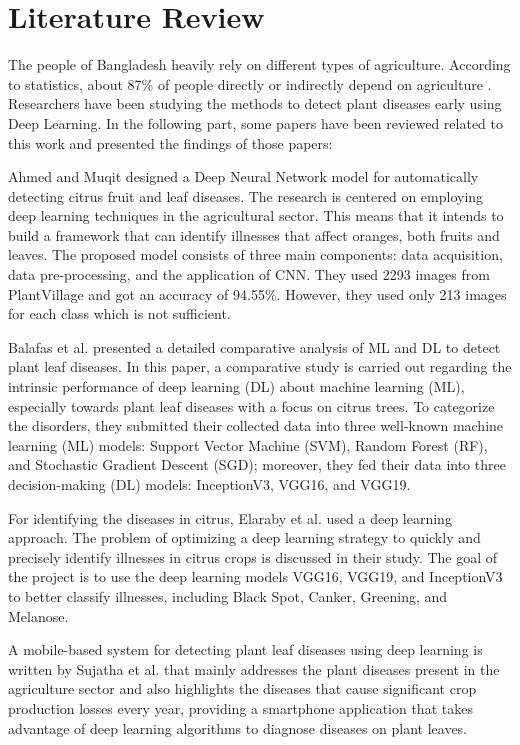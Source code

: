 \documentclass{ijcaArticle}
\begin{document}
\section{Literature Review}

\label{sec:literature_review}

The people of Bangladesh heavily rely on different types of agriculture. According to statistics, about 87\% of people directly or indirectly depend on agriculture \cite{p9}. Researchers have been studying the methods to detect plant diseases early using Deep Learning. In the following part, some papers have been reviewed related to this work and presented the findings of those papers:

Ahmed and Muqit \cite{p2} designed a Deep Neural Network model for automatically detecting citrus fruit and leaf diseases. The research is centered on employing deep learning techniques in the agricultural sector. This means that it intends to build a framework that can identify illnesses that affect oranges, both fruits and leaves. The proposed model consists of three main components: data acquisition, data pre-processing, and the application of CNN. They used 2293 images from PlantVillage and got an accuracy of 94.55\%. However, they used only 213 images for each class which is not sufficient.

Balafas et al. \cite{p3} presented a detailed comparative analysis of ML and DL to detect plant leaf diseases. In this paper, a comparative study is carried out regarding the intrinsic performance of deep learning (DL) about machine learning (ML), especially towards plant leaf diseases with a focus on citrus trees. To categorize the disorders, they submitted their collected data into three well-known machine learning (ML) models: Support Vector Machine (SVM), Random Forest (RF), and Stochastic Gradient Descent (SGD); moreover, they fed their data into three decision-making (DL) models: InceptionV3, VGG16, and VGG19.

For identifying the diseases in citrus, Elaraby et al. \cite{p5} used a deep learning approach. The problem of optimizing a deep learning strategy to quickly and precisely identify illnesses in citrus crops is discussed in their study. The goal of the project is to use the deep learning models VGG16, VGG19, and InceptionV3 to better classify illnesses, including Black Spot, Canker, Greening, and Melanose.

A mobile-based system for detecting plant leaf diseases using deep learning is written by Sujatha et al. \cite{p10} that mainly addresses the plant diseases present in the agriculture sector and also highlights the diseases that cause significant crop production losses every year, providing a smartphone application that takes advantage of deep learning algorithms to diagnose diseases on plant leaves.
\end{document}
